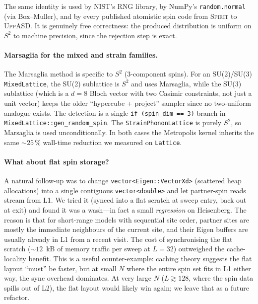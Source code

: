 \documentclass[11pt,letterpaper]{article}
\begin{document}
The same identity is used by NIST's RNG library, by NumPy's
\texttt{random.normal} (via Box--Muller), and by every published
atomistic spin code from \textsc{Spirit} to \textsc{UppASD}.  It is
genuinely free correctness: the produced distribution is uniform on
$S^2$ to machine precision, since the rejection step is exact.

\paragraph{Marsaglia for the mixed and strain families.}
The Marsaglia method is specific to $S^{2}$ (3-component spins).
For an SU(2)/SU(3) \texttt{MixedLattice}, the SU(2) sublattice is
$S^{2}$ and uses Marsaglia, while the SU(3) sublattice (which is a
$d{=}8$ Bloch vector with two Casimir constraints, not just a unit
vector) keeps the older ``hypercube + project'' sampler since
no two-uniform analogue exists.  The detection is a single
\texttt{if (spin\_dim == 3)} branch in
\texttt{MixedLattice::gen\_random\_spin}.  The
\texttt{StrainPhononLattice} is purely $S^{2}$, so Marsaglia is used
unconditionally.  In both cases the Metropolis kernel inherits the
same $\sim 25\,\%$ wall-time reduction we measured on
\texttt{Lattice}.

\paragraph{What about flat spin storage?}
A natural follow-up was to change \texttt{vector<Eigen::VectorXd>}
(scattered heap allocations) into a single contiguous
\texttt{vector<double>} and let partner-spin reads stream from L1.
We tried it (synced into a flat scratch at sweep entry, back out at
exit) and found it was a wash---in fact a small \emph{regression}
on Heisenberg.  The reason is that for short-range models with
sequential site order, partner sites are mostly the immediate
neighbours of the current site, and their Eigen buffers are usually
already in L1 from a recent visit.  The cost of synchronising the
flat scratch ($\sim 12$~kB of memory traffic per sweep at $L = 32$)
outweighed the cache-locality benefit.  This is a useful
counter-example: caching theory suggests the flat layout ``must''
be faster, but at small $N$ where the entire spin set fits in
L1 either way, the sync overhead dominates.  At very large $N$
($L \gtrsim 128$, where the spin data spills out of L2), the flat
layout would likely win again; we leave that as a future refactor.

\end{document}
